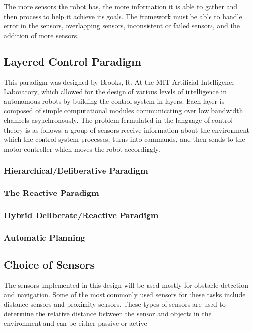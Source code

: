 The more sensors the robot has, the more information it is able to gather and then process to help it achieve its goals. The framework must be able to handle error in the sensors, overlapping sensors, inconsistent or failed sensors, and the addition of more sensors, 

\subsection*{Layered Control Paradigm \cite{Brooks:1985}}
This paradigm was designed by Brooks, R. At the MIT Artificial Intelligence Laboratory, which allowed for the design of various levels of intelligence in autonomous robots by building the control system in layers. Each layer is composed of simple computational modules communicating over low bandwidth channels asynchronously. The problem formulated in the language of control theory is as follows: a group of sensors receive information about the environment which the control system processes, turns into commands, and then sends to the motor controller which moves the robot accordingly.

\subsubsection*{Hierarchical/Deliberative Paradigm}
\subsubsection*{The Reactive Paradigm}
\subsubsection*{Hybrid Deliberate/Reactive Paradigm}
\subsubsection*{Automatic Planning}

\subsection*{Choice of Sensors}
The sensors implemented in this design will be used mostly for obstacle detection and navigation.  Some of the most commonly used sensors for these tasks include distance sensors and proximity sensors.  These types of sensors are used to determine the relative distance between the sensor and objects in the environment and can be either passive or active. 

